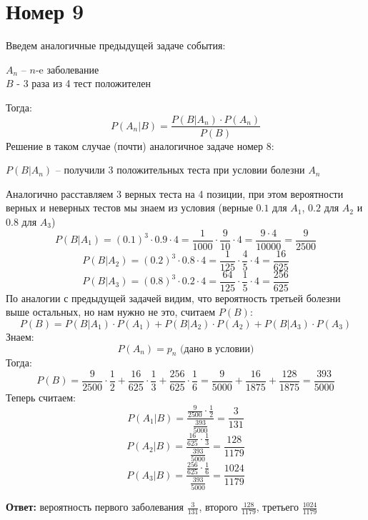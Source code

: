 \documentclass[a4paper,12pt]{article}
\begin{document}
\section*{Номер 9}
Введем аналогичные предыдущей задаче события:
\begin{center}
$A_n$ -- $n$-e заболевание \\
$B$ - 3 раза из 4 тест положителен
\end{center}
Тогда:
\[
P(A_n | B) = \frac{P(B | A_n) \cdot P(A_n)}{P(B)}
\]
Решение в таком случае (почти) аналогичное задаче номер 8:
\begin{center}
$P(B|A_n)$ -- получили 3 положительных теста при условии болезни $A_n$
\end{center}
Аналогично расставляем 3 верных теста на 4 позиции, при этом вероятности верных и неверных тестов мы знаем из условия (верные $0.1$ для $A_1$, $0.2$ для $A_2$ и $0.8$ для $A_3$)
\[
P(B|A_1) =(0.1)^3 \cdot 0.9 \cdot 4 = \frac{1}{1000} \cdot \frac{9}{10} \cdot 4 = \frac{9 \cdot 4}{10000} = \frac{9}{2500}
\]
\[
P(B|A_2) = (0.2)^3 \cdot 0.8 \cdot 4 = \frac{1}{125} \cdot \frac{4}{5} \cdot 4 = \frac{16}{625}
\]
\[
P(B|A_3) = (0.8)^3 \cdot 0.2 \cdot 4 = \frac{64}{125} \cdot \frac{1}{5} \cdot 4 = \frac{256}{625}
\]
По аналогии с предыдущей задачей видим, что вероятность третьей болезни выше остальных, но нам нужно не это, считаем $P(B)$:
\[
P(B) = P(B|A_1) \cdot P(A_1) + P(B|A_2) \cdot P(A_2) + P(B|A_3) \cdot P(A_3)\]
Знаем:
\[
P(A_n) = p_n \text{ (дано в условии)}
\]
Тогда:
\[
P(B) = \frac{9}{2500} \cdot \frac12+ \frac{16}{625}\cdot \frac13 + \frac{256}{625} \cdot \frac16 = \frac{9}{5000} + \frac{16}{1875} + \frac{128}{1875} = \frac{393}{5000}
\]
Теперь считаем:
\[
P(A_1|B) = \frac{\frac{9}{2500} \cdot \frac{1}{2}}{\frac{393}{5000}} = \frac{3}{131}
\] 
\[
P(A_2|B) = \frac{\frac{16}{625} \cdot \frac{1}{3}}{\frac{393}{5000}} = \frac{128}{1179}
\]
\[
P(A_3|B) = \frac{\frac{256}{625} \cdot \frac{1}{6}}{\frac{393}{5000}} = \frac{1024}{1179}
\]
\begin{center}
\textbf{Ответ: } вероятность первого заболевания $\frac{3}{131}$, второго $\frac{128}{1179}$, третьего $\frac{1024}{1179}$
\end{center}
\clearpage
\end{document}
